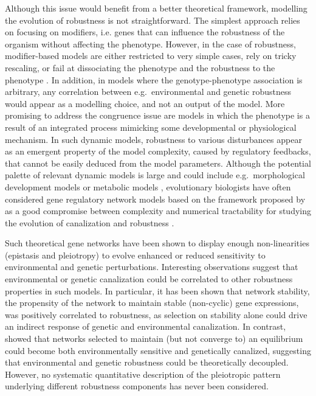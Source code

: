\documentclass[10pt,a4paper]{article}
\begin{document}
Although this issue would benefit from a better theoretical framework, modelling the evolution of robustness is not straightforward. The simplest approach relies on focusing on modifiers, i.e. genes that can influence the robustness of the organism without affecting the phenotype. However, in the case of robustness, modifier-based models are either restricted to very simple cases, rely on tricky rescaling, or fail at dissociating the phenotype and the robustness to the phenotype \citep{WBB97, Kaw00}. In addition, in models where the genotype-phenotype association is arbitrary, any correlation between e.g.\ environmental and genetic robustness would appear as a modelling choice, and not an output of the model. More promising to address the congruence issue are models in which the phenotype is a result of an integrated process mimicking some developmental or physiological mechanism. In such dynamic models, robustness to various disturbances appear as an emergent property of the model complexity, caused by regulatory feedbacks, that cannot be easily deduced from the model parameters. Although the potential palette of relevant dynamic models is large and could include e.g.\ morphological development models \citep{MS20} or metabolic models \citep{NBR19}, evolutionary biologists have often considered gene regulatory network models based on the framework proposed by \citealp{Wag94} as a good compromise between complexity and numerical tractability for studying the evolution of canalization and robustness \citep{LP12}.

Such theoretical gene networks have been shown to display enough non-linearities (epistasis and pleiotropy) to evolve enhanced or reduced sensitivity to environmental \citep{Mas04,EMW11,EMW11b} and genetic \citep{Wag96,BS03,DW08,ALS+06,RL16} perturbations. Interesting observations suggest that environmental or genetic canalization could be correlated to other robustness properties in such models. In particular, it has been shown that network stability, the propensity of the network to maintain stable (non-cyclic) gene expressions, was positively correlated to robustness, as selection on stability alone could drive an indirect response of genetic \citep{SB02} and environmental \citep{Mas04} canalization. In contrast, \citealp{ORL18} showed that networks selected to maintain (but not converge to) an equilibrium could become both environmentally sensitive and genetically canalized, suggesting that environmental and genetic robustness could be theoretically decoupled. However, no systematic quantitative description of the pleiotropic pattern underlying different robustness components has never been considered. 
\end{document}
